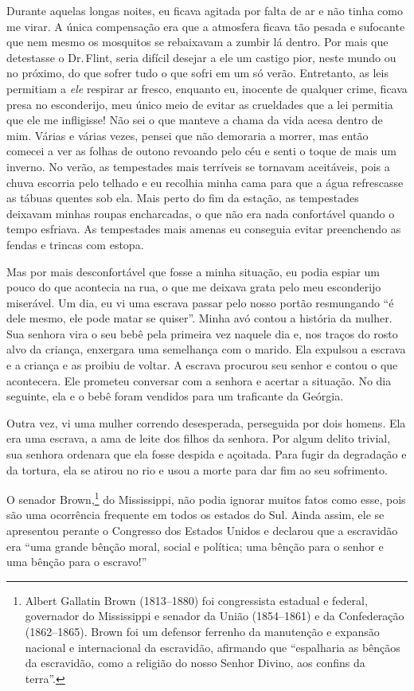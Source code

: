 Durante aquelas longas noites, eu
ficava agitada por falta de ar e não tinha como me virar. A única
compensação era que a atmosfera ficava tão pesada e sufocante que nem
mesmo os mosquitos se rebaixavam a zumbir lá dentro. Por mais que
detestasse o Dr.\,Flint, seria difícil desejar a ele um castigo pior,
neste mundo ou no próximo, do que sofrer tudo o que sofri em um só
verão. Entretanto, as leis permitiam a \emph{ele} respirar ar fresco,
enquanto eu, inocente de qualquer crime, ficava presa no esconderijo,
meu único meio de evitar as crueldades que a lei permitia que ele me
infligisse! Não sei o que manteve a chama da vida acesa dentro de mim.
Várias e várias vezes, pensei que não demoraria a morrer, mas então
comecei a ver as folhas de outono revoando pelo céu e senti o toque de
mais um inverno. No verão, as tempestades mais terríveis se tornavam
aceitáveis, pois a chuva escorria pelo telhado e eu recolhia minha cama
para que a água refrescasse as tábuas quentes sob ela. Mais perto do fim
da estação, as tempestades deixavam minhas roupas encharcadas, o que não
era nada confortável quando o tempo esfriava. As tempestades mais amenas
eu conseguia evitar preenchendo as fendas e trincas com estopa.

Mas por mais desconfortável que fosse a
minha situação, eu podia espiar um pouco do que acontecia na rua, o que
me deixava grata pelo meu esconderijo miserável. Um dia, eu vi uma
escrava passar pelo nosso portão resmungando ``é dele mesmo, ele pode
matar se quiser''. Minha avó contou a história da mulher. Sua senhora
vira o seu bebê pela primeira vez naquele dia e, nos traços do rosto
alvo da criança, enxergara uma semelhança com o marido. Ela expulsou a
escrava e a criança e as proibiu de voltar. A escrava procurou seu
senhor e contou o que acontecera. Ele prometeu conversar com a senhora e
acertar a situação. No dia seguinte, ela e o bebê foram vendidos para um
traficante da Geórgia.

Outra vez, vi uma mulher correndo
desesperada, perseguida por dois homens. Ela era uma escrava, a ama de
leite dos filhos da senhora. Por algum delito trivial, sua senhora
ordenara que ela fosse despida e açoitada. Para fugir da degradação e da
tortura, ela se atirou no rio e usou a morte para dar fim ao seu
sofrimento.

O senador Brown,\footnote{Albert
  Gallatin Brown (1813--1880) foi congressista estadual e federal,
  governador do Mississippi e senador da União (1854--1861) e da
  Confederação (1862--1865). Brown foi um defensor ferrenho da manutenção e
  expansão nacional e internacional da escravidão, afirmando que
  ``espalharia as bênçãos da escravidão, como a religião do nosso Senhor
  Divino, aos confins da terra''.} do Mississippi, não podia ignorar
muitos fatos como esse, pois são uma ocorrência frequente em todos os
estados do Sul. Ainda assim, ele se apresentou perante o Congresso dos
Estados Unidos e declarou que a escravidão era ``uma grande bênção
moral, social e política; uma bênção para o senhor e uma bênção para o
escravo!''

